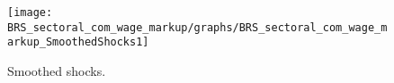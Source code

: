  
\begin{figure}[H]
\centering 
\texttt{[image: BRS\_sectoral\_com\_wage\_markup/graphs/BRS\_sectoral\_com\_wage\_markup\_SmoothedShocks1]}
\caption{Smoothed shocks.}\label{Fig:SmoothedShocks:1}
\end{figure}


